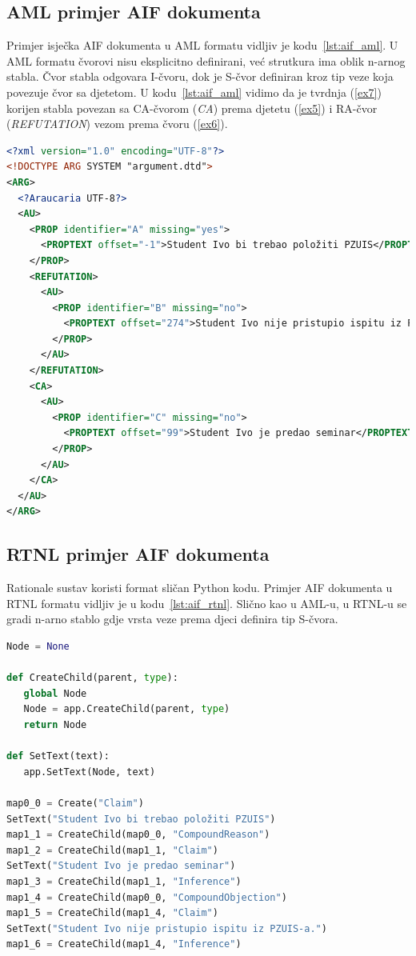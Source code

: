 \subsection{AML primjer AIF dokumenta}

Primjer isječka AIF dokumenta u AML formatu vidljiv je kodu~\ref{lst:aif_aml}.
U AML formatu čvorovi nisu eksplicitno definirani, već
strutkura ima oblik n-arnog stabla. Čvor stabla odgovara I-čvoru, dok je S-čvor
definiran kroz tip veze koja povezuje čvor sa djetetom. U kodu~\ref{lst:aif_aml}
vidimo da je tvrdnja (\ref{ex7}) korijen stabla 
povezan sa CA-čvorom (\emph{CA}) prema djetetu
(\ref{ex5}) i RA-čvor (\emph{REFUTATION}) vezom prema čvoru (\ref{ex6}).

\lstset{language=XML}
\begin{lstlisting}[caption={Primjer AIF AML dokumenta},label={lst:aif_aml},language=XML, captionpos=b]
<?xml version="1.0" encoding="UTF-8"?>
<!DOCTYPE ARG SYSTEM "argument.dtd">
<ARG>
  <?Araucaria UTF-8?>
  <AU>
    <PROP identifier="A" missing="yes">
      <PROPTEXT offset="-1">Student Ivo bi trebao položiti PZUIS</PROPTEXT>
    </PROP>
    <REFUTATION>
      <AU>
        <PROP identifier="B" missing="no">
          <PROPTEXT offset="274">Student Ivo nije pristupio ispitu iz PZUIS-a.</PROPTEXT>
        </PROP>
      </AU>
    </REFUTATION>
    <CA>
      <AU>
        <PROP identifier="C" missing="no">
          <PROPTEXT offset="99">Student Ivo je predao seminar</PROPTEXT>
        </PROP>
      </AU>
    </CA>
  </AU>
</ARG>
\end{lstlisting}

\subsection{RTNL primjer AIF dokumenta}

Rationale sustav koristi format sličan Python kodu. 
Primjer AIF dokumenta u RTNL formatu vidljiv je u kodu~\ref{lst:aif_rtnl}.
Slično kao u AML-u, u RTNL-u se gradi n-arno stablo gdje vrsta
veze prema djeci definira tip S-čvora. 


\begin{lstlisting}[caption={Primjer AIF RTNL dokumenta},label={lst:aif_rtnl},language=Python, captionpos=b]
Node = None

def CreateChild(parent, type):
   global Node
   Node = app.CreateChild(parent, type)
   return Node

def SetText(text):
   app.SetText(Node, text)

map0_0 = Create("Claim")
SetText("Student Ivo bi trebao položiti PZUIS")
map1_1 = CreateChild(map0_0, "CompoundReason")
map1_2 = CreateChild(map1_1, "Claim")
SetText("Student Ivo je predao seminar")
map1_3 = CreateChild(map1_1, "Inference")
map1_4 = CreateChild(map0_0, "CompoundObjection")
map1_5 = CreateChild(map1_4, "Claim")
SetText("Student Ivo nije pristupio ispitu iz PZUIS-a.")
map1_6 = CreateChild(map1_4, "Inference")
\end{lstlisting}

